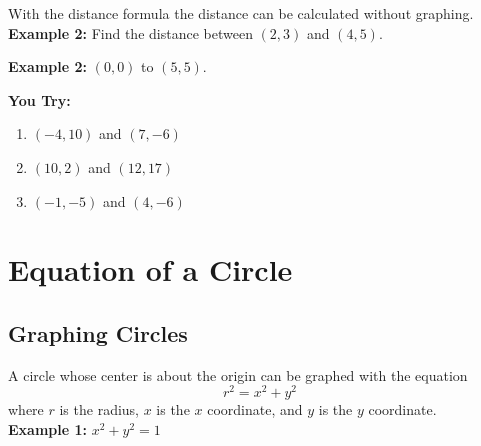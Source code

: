 \documentclass[12pt]{article}
\begin{document}
\begin{center}
\graph
\end{center}

With the distance formula the distance can be calculated without graphing.\\

\textbf{Example 2:} Find the distance between $(2,3)$ and $(4,5)$.\\

\vspace{1cm}

\textbf{Example 2:} $(0,0)$ to $(5,5)$.\\

\vspace{1cm}

\textbf{You Try:}

\begin{enumerate}
	
	\item $(-4,10)$ and $(7,-6)$\\

	\item $(10,2)$ and $(12, 17)$\\

	\item $(-1,-5)$ and $(4,-6)$\\

\end{enumerate}


\section*{Equation of a Circle}

\subsection*{Graphing Circles}

A circle whose center is about the origin can be graphed with the equation $$r^2=x^2+y^2$$ where $r$ is the radius, $x$ is the $x$ coordinate, and $y$ is the $y$ coordinate. \\

\textbf{Example 1:} $x^2+y^2=1$

\begin{center}
\end{center}
\end{document}
